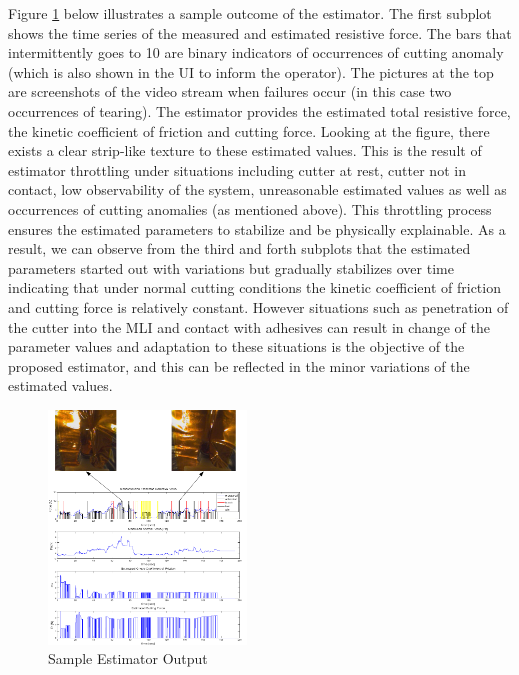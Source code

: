 \documentclass[letterpaper, 10 pt, conference]{ieeeconf}  %
\begin{document}
 Figure \ref{fig:5} below illustrates a sample outcome of the estimator. The first subplot shows the time series of the measured and estimated resistive force. The bars that intermittently goes to 10 are binary indicators of occurrences of cutting anomaly (which is also shown in the UI to inform the operator).  The pictures at the top are screenshots of the video stream when failures occur (in this case two occurrences of tearing). The estimator provides the estimated total resistive force, the kinetic coefficient of friction and cutting force. Looking at the figure,  there exists a clear strip-like texture to these estimated values. This is the result of estimator throttling under situations including cutter at rest, cutter not in contact, low observability of the system, unreasonable estimated values as well as occurrences of cutting anomalies (as mentioned above).  This throttling process ensures the estimated parameters to stabilize and be physically explainable. As a result, we can observe from the third and forth subplots that the estimated parameters started out with variations but gradually stabilizes over time indicating that under normal cutting conditions the kinetic coefficient of friction and cutting force is relatively constant. However situations such as  penetration of the cutter into the MLI and contact with adhesives can result in change of the parameter values and adaptation to these situations is the objective of the proposed estimator, and this can be reflected in the minor variations of the estimated values.


\begin{figure}[htbp]
\begin{center}
\includegraphics[width=0.47\textwidth]{figures/example.png}
\caption{Sample Estimator Output }
\label{fig:5}
\end{center}
\end{figure}
\end{document}
